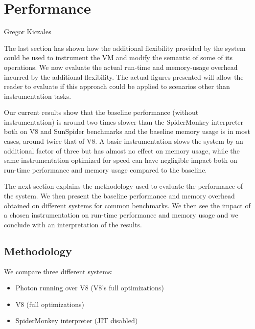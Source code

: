 \chapter{Performance}
{Gregor Kiczales~\cite{Kiczales92towardsa}}

\label{chap:Performance}

The last section has shown how the additional flexibility provided by the
system could be used to instrument the VM and modify the semantic of some of
its operations. We now evaluate the actual run-time and memory-usage overhead
incurred by the additional flexibility. The actual figures presented will allow
the reader to evaluate if this approach could be applied to scenarios other
than instrumentation tasks.

Our current results show that the baseline performance (without
instrumentation) is around two times slower than the SpiderMonkey interpreter
both on V8 and SunSpider benchmarks and the baseline memory usage is in most
cases, around twice that of V8. A basic instrumentation slows the system by an
additional factor of three but has almost no effect on memory usage, while the
same instrumentation optimized for speed can have negligible impact both on
run-time performance and memory usage compared to the baseline.

The next section explains the methodology used to evaluate the performance of
the system. We then present the baseline performance and memory overhead
obtained on different systems for common benchmarks. We then see the impact of
a chosen instrumentation on run-time performance and memory usage and we
conclude with an interpretation of the results. 

\section{Methodology}

We compare three different systems:
\begin{itemize}
    \item Photon running over V8 (V8's full optimizations)
    \item V8 (full optimizations)
    \item SpiderMonkey interpreter (JIT disabled)
\end{itemize}

